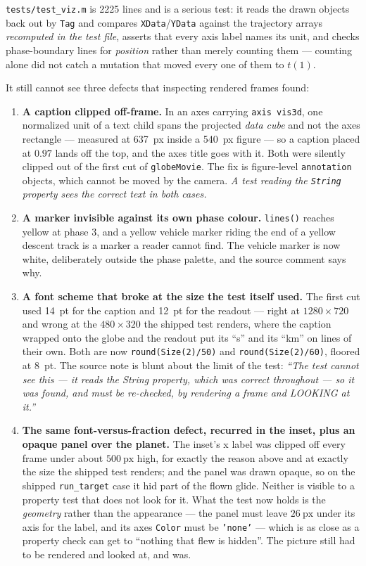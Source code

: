 \documentclass[11pt]{article}
\newcommand{\code}[1]{\texttt{#1}}
\begin{document}
\code{tests/test\_viz.m} is 2225 lines and is a serious test: it reads the
drawn objects back out by \code{Tag} and compares \code{XData}/\code{YData}
against the trajectory arrays \emph{recomputed in the test file}, asserts that
every axis label names its unit, and checks phase-boundary lines for
\emph{position} rather than merely counting them --- counting alone did not
catch a mutation that moved every one of them to $t(1)$.

It still cannot see three defects that inspecting rendered frames found:

\begin{enumerate}
\item \textbf{A caption clipped off-frame.} In an axes carrying
\code{axis vis3d}, one normalized unit of a text child spans the projected
\emph{data cube} and not the axes rectangle --- measured at 637~px inside a
540~px figure --- so a caption placed at $0.97$ lands off the top, and the axes
title goes with it. Both were silently clipped out of the first cut of
\code{globeMovie}. The fix is figure-level \code{annotation} objects, which
cannot be moved by the camera. \emph{A test reading the \code{String} property
sees the correct text in both cases.}

\item \textbf{A marker invisible against its own phase colour.}
\code{lines()} reaches yellow at phase 3, and a yellow vehicle marker riding
the end of a yellow descent track is a marker a reader cannot find. The vehicle
marker is now white, deliberately outside the phase palette, and the source
comment says why.

\item \textbf{A font scheme that broke at the size the test itself used.} The
first cut used 14~pt for the caption and 12~pt for the readout --- right at
$1280\times720$ and wrong at the $480\times320$ the shipped test renders, where
the caption wrapped onto the globe and the readout put its ``s'' and its ``km''
on lines of their own. Both are now \code{round(Size(2)/50)} and
\code{round(Size(2)/60)}, floored at 8~pt. The source note is blunt about the
limit of the test: \emph{``The test cannot see this --- it reads the String
property, which was correct throughout --- so it was found, and must be
re-checked, by rendering a frame and LOOKING at it.''}

\item \textbf{The same font-versus-fraction defect, recurred in the inset, plus
an opaque panel over the planet.} The inset's x label was clipped off every
frame under about $500~\mathrm{px}$ high, for exactly the reason above and at
exactly the size the shipped test renders; and the panel was drawn opaque, so
on the shipped \code{run\_target} case it hid part of the flown glide. Neither
is visible to a property test that does not look for it. What the test now
holds is the \emph{geometry} rather than the appearance --- the panel must
leave $26~\mathrm{px}$ under its axis for the label, and its axes \code{Color}
must be \code{'none'} --- which is as close as a property check can get to
``nothing that flew is hidden''. The picture still had to be rendered and
looked at, and was.
\end{enumerate}
\end{document}
